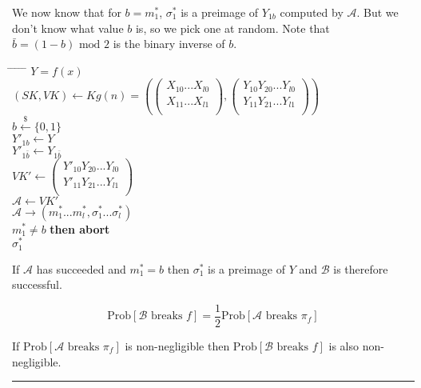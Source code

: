 \documentclass[twoside]{article}
\newenvironment{proof}{{\bf Proof:}}{\hfill\rule{2mm}{2mm}}
\begin{document}
\begin{proof}
We now know that for $b = m^*_1$, $\sigma^*_1$ is a preimage of $Y_{1b}$ computed by $\mathcal{A}$. But we don't know what value $b$ is, so we pick one at random. Note that $\bar{b} = (1 - b) \text{ mod } 2$ is the binary inverse of $b$.

\begin{tabbing}
\hspace*{.25in} \= \hspace*{.25in} \= \hspace*{.25in} \= \hspace*{.25in} \= \hspace*{.25in} \=\kill
{} $Y = f(x)$\\
\>$(SK, VK) \leftarrow Kg(n) = \left(
\begin{pmatrix}
X_{10}...X_{l0}\\
X_{11}...X_{l1}\\
\end{pmatrix},
\begin{pmatrix}
Y_{10}Y_{20}...Y_{l0}\\
Y_{11}Y_{21}...Y_{l1}\\
\end{pmatrix}\right)$\\
\>$b \xleftarrow{\$} \{0,1\}$\\
\>$Y'_{1b} \leftarrow Y$\\
\>$Y'_{1\bar{b}} \leftarrow Y_{1\bar{b}}$\\
\>$VK' \leftarrow
\begin{pmatrix}
Y'_{10}Y_{20}...Y_{l0}\\
Y'_{11}Y_{21}...Y_{l1}\\
\end{pmatrix}$\\
\>$\mathcal{A} \leftarrow VK'$\\
\>$\mathcal{A} \rightarrow (m^*_1...m^*_l,\sigma^*_1...\sigma^*_l)$\\
 $m^*_1 \neq b$ {\bf then abort}\\
 $\sigma^*_1$
\end{tabbing}

If $\mathcal{A}$ has succeeded and $m^*_1 = b$ then $\sigma_1^*$ is a preimage of $Y$ and $\mathcal{B}$ is therefore successful.

$$\text{Prob}[\mathcal{B}\text{ breaks }f] = \frac{1}{2}\text{Prob}[\mathcal{A}\text{ breaks }\pi_f]$$

If $\text{Prob}[\mathcal{A}\text{ breaks }\pi_f]$ is non-negligible then $\text{Prob}[\mathcal{B}\text{ breaks }f]$ is also non-negligible.
\end{proof}
\end{document}
